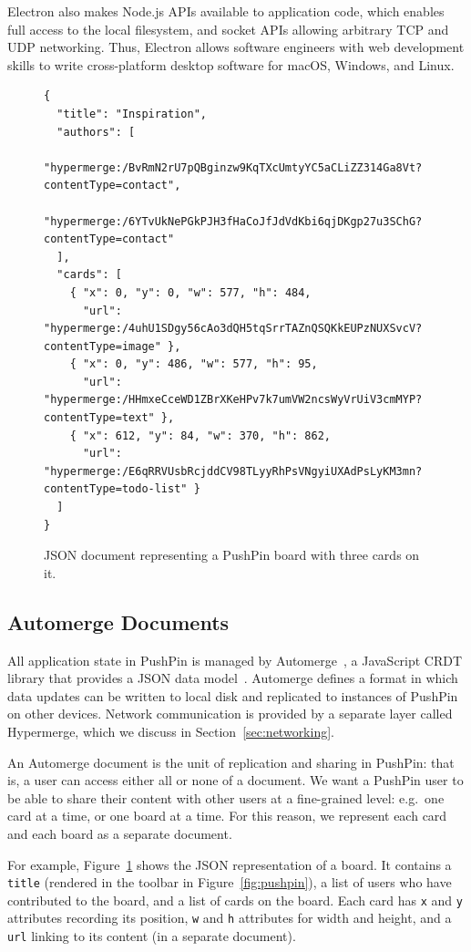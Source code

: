\documentclass[sigplan,10pt]{acmart}
\begin{document}
Electron also makes Node.js APIs available to application code, which enables full access to the local filesystem, and socket APIs allowing arbitrary TCP and UDP networking.
Thus, Electron allows software engineers with web development skills to write cross-platform desktop software for macOS, Windows, and Linux.

\begin{figure}
\begin{verbatim}
{
  "title": "Inspiration",
  "authors": [
    "hypermerge:/BvRmN2rU7pQBginzw9KqTXcUmtyYC5aCLiZZ314Ga8Vt?contentType=contact",
    "hypermerge:/6YTvUkNePGkPJH3fHaCoJfJdVdKbi6qjDKgp27u3SChG?contentType=contact"
  ],
  "cards": [
    { "x": 0, "y": 0, "w": 577, "h": 484,
      "url": "hypermerge:/4uhU1SDgy56cAo3dQH5tqSrrTAZnQSQKkEUPzNUXSvcV?contentType=image" },
    { "x": 0, "y": 486, "w": 577, "h": 95,
      "url": "hypermerge:/HHmxeCceWD1ZBrXKeHPv7k7umVW2ncsWyVrUiV3cmMYP?contentType=text" },
    { "x": 612, "y": 84, "w": 370, "h": 862,
      "url": "hypermerge:/E6qRRVUsbRcjddCV98TLyyRhPsVNgyiUXAdPsLyKM3mn?contentType=todo-list" }
  ]
}
\end{verbatim}
\caption{JSON document representing a PushPin board with three cards on it.}
\label{fig:board-json}
\end{figure}


\subsection{Automerge Documents}\label{sec:documents}

All application state in PushPin is managed by Automerge~\cite{Automerge:2018,Automerge}, a JavaScript CRDT library that provides a JSON data model~\cite{Kleppmann:2017ca}.
Automerge defines a format in which data updates can be written to local disk and replicated to instances of PushPin on other devices.
Network communication is provided by a separate layer called Hypermerge, which we discuss in Section~\ref{sec:networking}.

An Automerge document is the unit of replication and sharing in PushPin: that is, a user can access either all or none of a document.
We want a PushPin user to be able to share their content with other users at a fine-grained level: e.g.\ one card at a time, or one board at a time.
For this reason, we represent each card and each board as a separate document.

For example, Figure~\ref{fig:board-json} shows the JSON representation of a board.
It contains a \texttt{title} (rendered in the toolbar in Figure~\ref{fig:pushpin}), a list of users who have contributed to the board, and a list of cards on the board.
Each card has \texttt{x} and \texttt{y} attributes recording its position, \texttt{w} and \texttt{h} attributes for width and height, and a \texttt{url} linking to its content (in a separate document).
\end{document}

